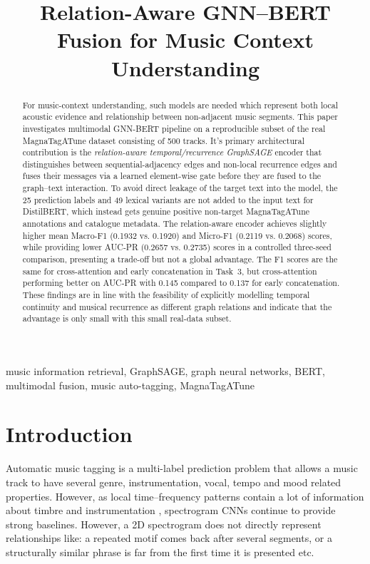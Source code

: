 \documentclass[conference]{IEEEtran}
\title{Relation-Aware GNN--BERT Fusion for Music Context Understanding}
\author{\IEEEauthorblockN{Anisha Hasnat}
\IEEEauthorblockA{Student ID.: 22301775\\ 
Department of Computer Science and Engineering\\
Project on Neural Networks (CSE425 / EEE474 / CSE715)\\
\texttt{dummy github link}}}
\begin{document}
\maketitle

\begin{abstract}
For music-context understanding, such models are needed which represent both local acoustic evidence and relationship between non-adjacent music segments. This paper investigates multimodal GNN-BERT pipeline on a reproducible subset of the real MagnaTagATune dataset consisting of 500 tracks. It's primary architectural contribution is the \emph{relation-aware temporal/recurrence GraphSAGE} encoder that distinguishes between sequential-adjacency edges and non-local recurrence edges and fuses their messages via a learned element-wise gate before they are fused to the graph--text interaction. To avoid direct leakage of the target text into the model, the 25 prediction labels and 49 lexical variants are not added to the input text for DistilBERT, which instead gets genuine positive non-target MagnaTagATune annotations and catalogue metadata. The relation-aware encoder achieves slightly higher mean Macro-F1 (0.1932 vs. 0.1920) and Micro-F1 (0.2119 vs. 0.2068) scores, while providing lower AUC-PR (0.2657 vs. 0.2735) scores in a controlled three-seed comparison, presenting a trade-off but not a global advantage. The F1 scores are the same for cross-attention and early concatenation in Task~3, but cross-attention performing better on AUC-PR with 0.145 compared to 0.137 for early concatenation. These findings are in line with the feasibility of explicitly modelling temporal continuity and musical recurrence as different graph relations and indicate that the advantage is only small with this small real-data subset.
\end{abstract}

\begin{IEEEkeywords}
music information retrieval, GraphSAGE, graph neural networks, BERT, multimodal fusion, music auto-tagging, MagnaTagATune
\end{IEEEkeywords}

\section{Introduction}
Automatic music tagging is a multi-label prediction problem that allows a music track to have several genre, instrumentation, vocal, tempo and mood related properties. However, as local time--frequency patterns contain a lot of information about timbre and instrumentation \cite{choi2016,pons2019}, spectrogram CNNs continue to provide strong baselines. However, a 2D spectrogram does not directly represent relationships like: a repeated motif comes back after several segments, or a structurally similar phrase is far from the first time it is presented etc.
\end{document}
